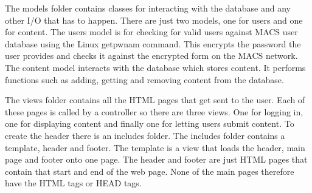 The models folder contains classes for interacting with the database and any other I/O that has to happen. There are just two models, one for users and one for content. The users model is for checking for valid users against MACS user database using the Linux getpwnam command. This encrypts the password the user provides and checks it against the encrypted form on the MACS network. The content model interacts with the database which stores content. It performs functions such as adding, getting and removing content from the database.

The views folder contains all the HTML pages that get sent to the user. Each of these pages is called by a controller so there are three views. One for logging in, one for displaying content and finally one for letting users submit content. To create the header there is an includes folder. The includes folder contains a template, header and footer. The template is a view that loads the header, main page and footer onto one page. The header and footer are just HTML pages that contain that start and end of the web page. None of the main pages therefore have the HTML tags or HEAD tags. 
